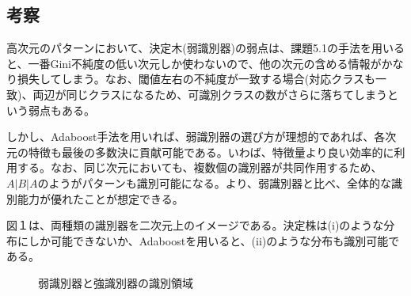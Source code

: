 \documentclass[ %
  uplatex,%
  papersize%
]{jsarticle}
\begin{document}
\subsection{考察}
高次元のパターンにおいて、決定木(弱識別器)の弱点は、課題5.1の手法を用いると、一番Gini不純度の低い次元しか使わないので、他の次元の含める情報がかなり損失してしまう。なお、閾値左右の不純度が一致する場合(対応クラスも一致)、両辺が同じクラスになるため、可識別クラスの数がさらに落ちてしまうという弱点もある。

しかし、Adaboost手法を用いれば、弱識別器の選び方が理想的であれば、各次元の特徴も最後の多数決に貢献可能である。いわば、特徴量より良い効率的に利用する。なお、同じ次元においても、複数個の識別器が共同作用するため、$A|B|A$のようがパターンも識別可能になる。より、弱識別器と比べ、全体的な識別能力が優れたことが想定できる。

図１は、両種類の識別器を二次元上のイメージである。決定株は(i)のような分布にしか可能できないか、Adaboostを用いると、(ii)のような分布も識別可能である。

\begin{figure}[!h]
\centering
{}
\caption{弱識別器と強識別器の識別領域} 
\end{figure}
\end{document}

